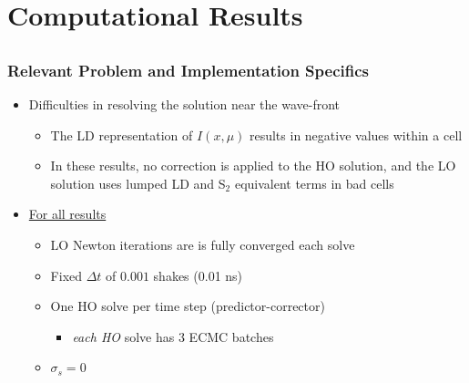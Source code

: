 \documentclass[xcolor=dvipsnames,hyperref={pdfpagelabels=false},unknownkeysallowed]{beamer}
\renewcommand{\u}[1]{\underline{#1}}
\newlength{\wideitemsep}
\let\olditem\item
\renewcommand{\item}{\setlength{\itemsep}{\wideitemsep}\olditem}
\begin{document}
\section{Computational Results}
\subsection{}

\begin{frame}
    \frametitle{Relevant Problem and Implementation Specifics }
    \begin{itemize}
    \item Difficulties in resolving the solution near the wave-front
        \begin{itemize}
            \item The LD representation of $I(x,\mu)$ results in negative values within a
                cell
            \item In these results, no correction is applied to the HO solution, and the LO
                solution uses lumped LD and S$_2$ equivalent terms in bad cells
        \end{itemize}
     
 \item \u{For all results}
        \begin{itemize}
    \item LO Newton iterations are is fully converged each solve
    \item Fixed $\Delta t$ of $0.001$ shakes (0.01 ns)
    \item One HO solve per time step (predictor-corrector)
        \begin{itemize}
            \item \emph{each HO} solve has 3 ECMC batches
        \end{itemize}
    \item $\sigma_s = 0$
    \end{itemize}
    \end{itemize}
\end{frame}
\end{document}
